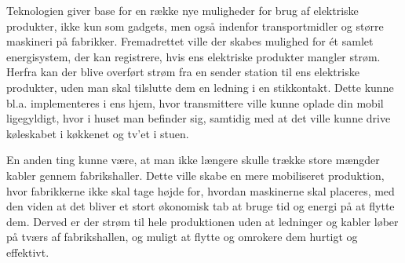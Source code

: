 Teknologien giver base for en række nye muligheder for brug af elektriske produkter, ikke kun som gadgets, men også indenfor transportmidler og større maskineri på fabrikker. Fremadrettet ville der skabes mulighed for ét samlet energisystem, der kan registrere, hvis ens elektriske produkter mangler strøm. Herfra kan der blive overført strøm fra en sender station til ens elektriske produkter, uden man skal tilslutte dem en ledning i en stikkontakt. Dette kunne bl.a. implementeres i ens hjem, hvor transmittere ville kunne oplade din mobil ligegyldigt, hvor i huset man befinder sig, samtidig med at det ville kunne drive køleskabet i køkkenet og tv'et i stuen.

En anden ting kunne være, at man ikke længere skulle trække store mængder kabler gennem fabrikshaller. Dette ville skabe en mere mobiliseret produktion, hvor fabrikkerne ikke skal tage højde for, hvordan maskinerne skal placeres, med den viden at det bliver et stort økonomisk tab at bruge tid og energi på at flytte dem. Derved er der strøm til hele produktionen uden at ledninger og kabler løber på tværs af fabrikshallen, og muligt at flytte og omrokere dem hurtigt og effektivt.\cite{fabrik}

\newpage